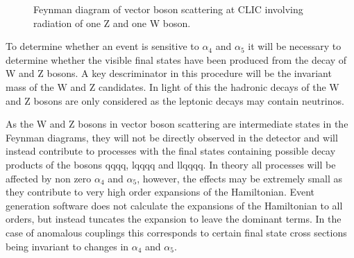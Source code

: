 \begin{figure}
\caption[Feynman diagram of vector boson scattering at CLIC involving radiation of one Z and one W boson.]{Feynman diagram of vector boson scattering at CLIC involving radiation of one Z and one W boson.}
\label{fig:vbszw}
\end{figure}

To determine whether an event is sensitive to $\alpha_{4}$ and $\alpha_{5}$ it will be necessary to determine whether the visible final states have been produced from the decay of W and Z bosons.  A key descriminator in this procedure will be the invariant mass of the W and Z candidates.  In light of this the hadronic decays of the W and Z bosons are only considered as the leptonic decays may contain neutrinos.

As the W and Z bosons in vector boson scattering are intermediate states in the Feynman diagrams, they will not be directly observed in the detector and will instead contribute to processes with the final states containing possible decay products of the bosons \nu{\nu}qqqq, l{\nu}qqqq and llqqqq.  In theory all processes will be affected by non zero $\alpha_{4}$ and $\alpha_{5}$, however, the effects may be extremely small as they contribute to very high order expansions of the Hamiltonian.  Event generation software does not calculate the expansions of the Hamiltonian to all orders, but instead tuncates the expansion to leave the dominant terms.  In the case of anomalous couplings this corresponds to certain final state cross sections being invariant to changes in $\alpha_{4}$ and $\alpha_{5}$.  


